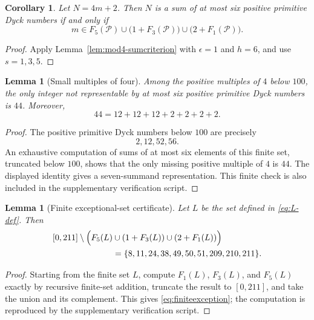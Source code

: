 \documentclass[11pt]{article}
\theoremstyle{plain}
\newtheorem{lemma}[theorem]{Lemma}
\newtheorem{corollary}[theorem]{Corollary}
\theoremstyle{definition}
\newcommand{\Pset}{\mathcal P}
\begin{document}
\begin{corollary}\label{cor:sixcriterion}
Let $N=4m+2$.  Then $N$ is a sum of at most six positive primitive Dyck
numbers if and only if
\begin{equation}\label{eq:sixcriterion}
 m\in F_5(\Pset)
 \cup\bigl(1+F_3(\Pset)\bigr)
 \cup\bigl(2+F_1(\Pset)\bigr).
\end{equation}
\end{corollary}

\begin{proof}
Apply Lemma~\ref{lem:mod4-sumcriterion} with
$\epsilon=1$ and $h=6$, and use $s=1,3,5$.
\end{proof}

\begin{lemma}[Small multiples of four]\label{lem:smallmultiples}
Among the positive multiples of $4$ below $100$, the only integer not
representable by at most six positive primitive Dyck numbers is $44$.
Moreover,
\[
 44=12+12+12+2+2+2+2.
\]
\end{lemma}

\begin{proof}
The positive primitive Dyck numbers below $100$ are precisely
\[
 2,12,52,56.
\]
An exhaustive computation of sums of at most six elements of this finite
set, truncated below $100$, shows that the only missing positive multiple
of $4$ is $44$.  The displayed identity gives a seven-summand
representation.  This finite check is also included in the supplementary
verification script.
\end{proof}

\begin{lemma}[Finite exceptional-set certificate]\label{lem:finiteexception}
Let $L$ be the set defined in \eqref{eq:L-def}.  Then
\begin{equation}\label{eq:finiteexception}
\begin{split}
 [0,211]\setminus\Bigl(
 F_5(L)&\cup(1+F_3(L))\cup(2+F_1(L))\Bigr)\\
 &=\{8,11,24,38,49,50,51,209,210,211\}.
\end{split}
\end{equation}
\end{lemma}

\begin{proof}
Starting from the finite set $L$, compute $F_1(L)$, $F_3(L)$, and
$F_5(L)$ exactly by recursive finite-set addition, truncate the result to
$[0,211]$, and take the union and its complement.  This gives
\eqref{eq:finiteexception}; the computation is reproduced by the
supplementary verification script.
\end{proof}
\end{document}
